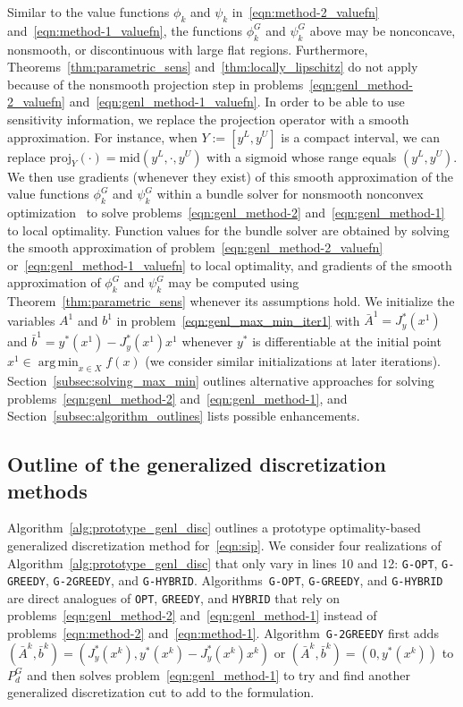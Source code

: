 \documentclass{article}
\DeclareMathOperator*{\argmin}{arg\,min}
\newcommand{\1}[1]{\mathds{1}\left[#1\right]}
\begin{document}
Similar to the value functions $\phi_k$ and $\psi_k$ in~\eqref{eqn:method-2_valuefn} and~\eqref{eqn:method-1_valuefn}, the functions $\phi^G_k$ and $\psi^G_k$ above may be nonconcave, nonsmooth, or discontinuous with large flat regions.
Furthermore, Theorems~\ref{thm:parametric_sens} and~\ref{thm:locally_lipschitz} do not apply because of the nonsmooth projection step in problems~\eqref{eqn:genl_method-2_valuefn} and~\eqref{eqn:genl_method-1_valuefn}.
In order to be able to use sensitivity information, we replace the projection operator with a smooth approximation.
For instance, when $Y := [y^L, y^U]$ is a compact interval, we can replace $\text{proj}_Y(\cdot) = \text{mid}(y^L, \cdot, y^U)$ with a sigmoid whose range equals $(y^L, y^U)$.
We then use gradients (whenever
they exist) of this smooth approximation of the value functions $\phi^G_k$ and $\psi^G_k$ within
a bundle solver for nonsmooth nonconvex optimization~\cite{makela2003multiobjective} to solve problems~\eqref{eqn:genl_method-2} and~\eqref{eqn:genl_method-1} to local optimality.
Function values for the bundle solver are obtained by solving the smooth approximation of problem~\eqref{eqn:genl_method-2_valuefn} or~\eqref{eqn:genl_method-1_valuefn} to local optimality, and gradients of the smooth approximation of $\phi^G_k$ and $\psi^G_k$ may be computed using Theorem~\ref{thm:parametric_sens} whenever its assumptions hold.
We initialize the variables $A^1$ and $b^1$ in problem~\eqref{eqn:genl_max_min_iter1} with $\bar{A}^1 = J^*_y(x^1)$ and $\bar{b}^1 = y^*(x^1) - J^*_y(x^1) x^1$ whenever $y^*$ is differentiable at the initial point $x^1 \in \argmin_{x \in X} f(x)$ (we consider similar initializations at later iterations).
Section~\ref{subsec:solving_max_min} outlines alternative approaches for solving problems~\eqref{eqn:genl_method-2} and~\eqref{eqn:genl_method-1}, and Section~\ref{subsec:algorithm_outlines} lists possible enhancements.



\subsection{Outline of the generalized discretization methods}
\label{subsec:genl_algorithm_outlines}




Algorithm~\ref{alg:prototype_genl_disc} outlines a prototype optimality-based generalized discretization method for~\eqref{eqn:sip}. 
We consider four realizations of Algorithm~\ref{alg:prototype_genl_disc} that only vary in lines 10 and 12:
\texttt{G-OPT}, \texttt{G-GREEDY}, \texttt{G-2GREEDY}, and \texttt{G-HYBRID}.
Algorithms~\texttt{G-OPT}, \texttt{G-GREEDY}, and \texttt{G-HYBRID} are direct analogues of \texttt{OPT}, \texttt{GREEDY}, and \texttt{HYBRID} that rely on problems~\eqref{eqn:genl_method-2} and~\eqref{eqn:genl_method-1} instead of problems~\eqref{eqn:method-2} and~\eqref{eqn:method-1}.
Algorithm~\texttt{G-2GREEDY} first adds $(\bar{A}^{k}, \bar{b}^k) = (J^*_y(x^k), y^*(x^k) - J^*_y(x^k) x^k)$ or $(\bar{A}^{k}, \bar{b}^k) = (0, y^*(x^k))$ to $P^G_d$ and then solves problem~\eqref{eqn:genl_method-1} to try and find another generalized discretization cut to add to the formulation.
\end{document}
